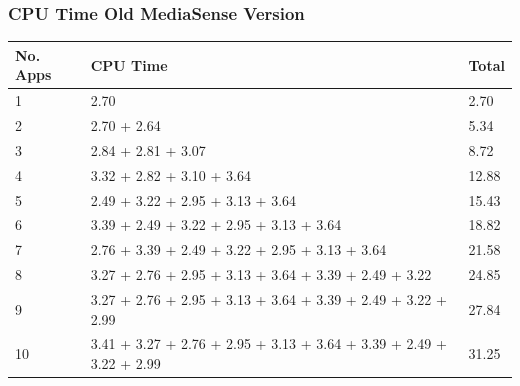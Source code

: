 \subsubsection{CPU Time Old MediaSense Version}
\begin{center}
    \begin{tabular}{ | l | p{9cm} | l |}
    \hline
    No. Apps				 								& CPU Time	 																	& Total\\ \hline
    1 													& 2.70 																			& 2.70\\ \hline
    2 													& 2.70 + 2.64																	& 5.34\\ \hline
    3 													& 2.84 + 2.81 + 3.07 															& 8.72\\ \hline
    4 													& 3.32 + 2.82 + 3.10 + 3.64														& 12.88\\ \hline
    5 													& 2.49 + 3.22 + 2.95 + 3.13 + 3.64												& 15.43 \\ \hline
    6 													& 3.39 + 2.49 + 3.22 + 2.95 + 3.13 + 3.64										& 18.82\\ \hline
    7 													& 2.76 + 3.39 + 2.49 + 3.22 + 2.95 + 3.13 + 3.64								& 21.58\\ \hline
    8 													& 3.27 + 2.76 + 2.95 + 3.13 + 3.64 + 3.39 + 2.49 + 3.22 						& 24.85\\ \hline
    9 													& 3.27 + 2.76 + 2.95 + 3.13 + 3.64 + 3.39 + 2.49 + 3.22 + 2.99					& 27.84\\ \hline
    10 													& 3.41 + 3.27 + 2.76 + 2.95 + 3.13 + 3.64 + 3.39 + 2.49 + 3.22 + 2.99			& 31.25\\ \hline
    \end{tabular}
\end{center}


